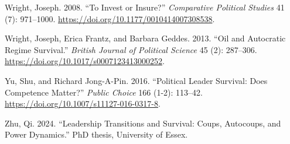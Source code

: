 \documentclass[
  12pt,
]{article}
\newlength{\cslhangindent}
\newenvironment{CSLReferences}[2] %
 {\begin{list}{}{%
  \setlength{\itemindent}{0pt}
  \setlength{\leftmargin}{0pt}
  \setlength{\parsep}{0pt}
  \ifodd #1
   \setlength{\leftmargin}{\cslhangindent}
   \setlength{\itemindent}{-1\cslhangindent}
  \fi
  \setlength{\itemsep}{#2\baselineskip}}}
 {\end{list}}
\begin{document}
\begin{CSLReferences}{1}{0}
Wright, Joseph. 2008. {``To Invest or Insure?''} \emph{Comparative
Political Studies} 41 (7): 971--1000.
\url{https://doi.org/10.1177/0010414007308538}.

Wright, Joseph, Erica Frantz, and Barbara Geddes. 2013. {``Oil and
Autocratic Regime Survival.''} \emph{British Journal of Political
Science} 45 (2): 287--306.
\url{https://doi.org/10.1017/s0007123413000252}.

Yu, Shu, and Richard Jong-A-Pin. 2016. {``Political Leader Survival:
Does Competence Matter?''} \emph{Public Choice} 166 (1-2): 113--42.
\url{https://doi.org/10.1007/s11127-016-0317-8}.

Zhu, Qi. 2024. {``Leadership Transitions and Survival: Coups, Autocoups,
and Power Dynamics.''} PhD thesis, University of Essex.

\end{CSLReferences}
\end{document}
